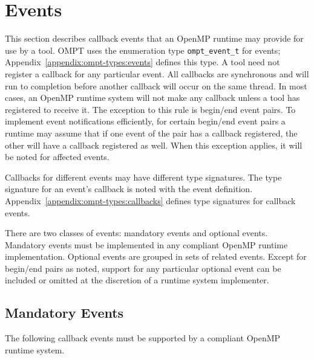 \documentclass{article}
\newcommand{\descheader}[1]{{\needspace{3\baselineskip}\vspace{1em}\noindent \fbox{#1}}}
\begin{document}
\section{Events}
\label{sec:events} 

This section describes callback events that an OpenMP runtime 
may provide for use by a tool. OMPT uses the enumeration type \verb|ompt_event_t| for events; 
Appendix~\ref{appendix:ompt-types:events} defines this type. 
A tool need not register a callback for any particular event.
All callbacks are synchronous and will run to completion before another callback will occur on the same thread.
In most cases, an OpenMP runtime system will not make any callback unless a  tool has registered to receive it. The exception to this rule is begin/end event pairs. 
To implement event notifications efficiently, for certain begin/end event pairs a runtime may assume that if one event of the pair has a callback registered, the other will have a callback registered as well. When this exception applies, it will be noted for affected events.

Callbacks for different events may have different type signatures. 
The type signature for an event's callback is noted with the event definition.  Appendix~\ref{appendix:ompt-types:callbacks} defines type signatures for callback events.


There are two classes of events: mandatory events and optional events.
Mandatory events must be implemented in any compliant OpenMP runtime implementation. 
Optional events are grouped in sets of related events. Except for begin/end pairs as noted, support for any particular optional event can be included or omitted at the 
discretion of a runtime system implementer. 




\subsection{Mandatory Events}

 The following callback events must be supported by a compliant OpenMP 
 runtime system. 

\descheader{Threads}
\end{document}
